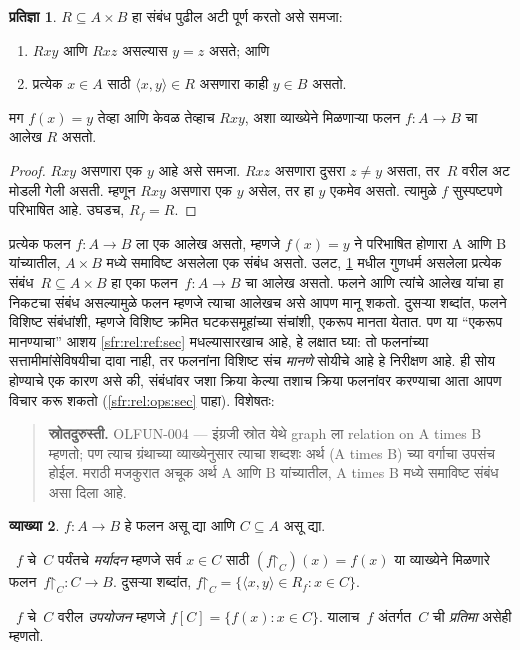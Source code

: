 \documentclass[11pt,a4paper,openany]{book}
\theoremstyle{definition}
\newtheorem{defn}{व्याख्या}[section]
\newtheorem{prop}[defn]{प्रतिज्ञा}
\newenvironment{explain}{}{}
\newcommand{\Setabs}[2]{\{#1:#2\}}
\newcommand{\tuple}[1]{\langle #1\rangle}
\newcommand{\funrestrictionto}[2]{#1\mathord{\restriction}_{#2}}
\newcommand{\funimage}[2]{#1[#2]}
\begin{document}
\begin{prop}\label{sfr:fun:rel:prop:graph-function}
$R \subseteq A \times B$ हा संबंध पुढील अटी पूर्ण करतो असे समजा:
\begin{enumerate}
\item $Rxy$ आणि $Rxz$ असल्यास $y = z$ असते; आणि
\item प्रत्येक $x \in A$ साठी $\tuple{x,
y} \in R$ असणारा काही $y \in B$ असतो.
\end{enumerate}
मग $f(x) = y$ तेव्हा आणि केवळ तेव्हाच $Rxy$, अशा व्याख्येने मिळणाऱ्या
फलन $f\colon A \to B$ चा आलेख $R$ असतो.
\end{prop}

\begin{proof}
$Rxy$ असणारा एक $y$ आहे असे समजा. $Rxz$ असणारा दुसरा $z \neq y$
असता, तर~$R$ वरील अट मोडली गेली असती. म्हणून $Rxy$ असणारा एक $y$
असेल, तर हा $y$ एकमेव असतो. त्यामुळे $f$ सुस्पष्टपणे परिभाषित आहे.
उघडच, $R_f = R$.
\end{proof}

\begin{explain}
प्रत्येक फलन $f\colon A \to B$ ला एक आलेख असतो, म्हणजे $f(x) = y$
ने परिभाषित होणारा A आणि B यांच्यातील, $A \times B$ मध्ये
समाविष्ट असलेला एक संबंध असतो. उलट,
\ref{sfr:fun:rel:prop:graph-function} मधील गुणधर्म असलेला प्रत्येक संबंध~$R
\subseteq A \times B$ हा एका फलन~$f \colon A \to B$ चा आलेख असतो.
फलने आणि त्यांचे आलेख यांचा हा निकटचा संबंध असल्यामुळे फलन म्हणजे
त्याचा आलेखच असे आपण मानू शकतो. दुसऱ्या शब्दांत, फलने विशिष्ट
संबंधांशी, म्हणजे विशिष्ट क्रमित घटकसमूहांच्या संचांशी, एकरूप मानता
येतात. पण या ``एकरूप मानण्याचा'' आशय
\ref{sfr:rel:ref:sec} मधल्यासारखाच आहे, हे लक्षात घ्या: तो
फलनांच्या सत्तामीमांसेविषयीचा दावा नाही, तर फलनांना विशिष्ट संच
\emph{मानणे} सोयीचे आहे हे निरीक्षण आहे. ही सोय होण्याचे एक कारण असे की,
संबंधांवर जशा क्रिया केल्या तशाच क्रिया फलनांवर करण्याचा आता आपण
विचार करू शकतो (\ref{sfr:rel:ops:sec} पाहा). विशेषतः:
\end{explain}
\begin{quote}\small\textbf{स्रोतदुरुस्ती.} OLFUN-004 — इंग्रजी स्रोत येथे graph ला relation on A times B म्हणतो; पण त्याच ग्रंथाच्या व्याख्येनुसार त्याचा शब्दशः अर्थ (A times B) च्या वर्गाचा उपसंच होईल. मराठी मजकुरात अचूक अर्थ A आणि B यांच्यातील, A times B मध्ये समाविष्ट संबंध असा दिला आहे.\end{quote}

\begin{defn}\label{sfr:fun:rel:defn:funimage}
$f \colon A \to B$ हे फलन असू द्या आणि $C\subseteq A$ असू द्या.

~$f$ चे~$C$ पर्यंतचे \emph{मर्यादन} म्हणजे सर्व $x \in C$ साठी
$(\funrestrictionto{f}{C})(x) = f(x)$ या व्याख्येने मिळणारे
फलन~$\funrestrictionto{f}{C}\colon C \to B$. दुसऱ्या शब्दांत,
$\funrestrictionto{f}{C} = \Setabs{\tuple{x, y} \in R_f}{x \in C}$.

~$f$ चे~$C$ वरील \emph{उपयोजन} म्हणजे $\funimage{f}{C} =
\Setabs{f(x)}{x \in C}$. यालाच~$f$ अंतर्गत~$C$ ची \emph{प्रतिमा}
असेही म्हणतो.
\end{defn}
\end{document}
